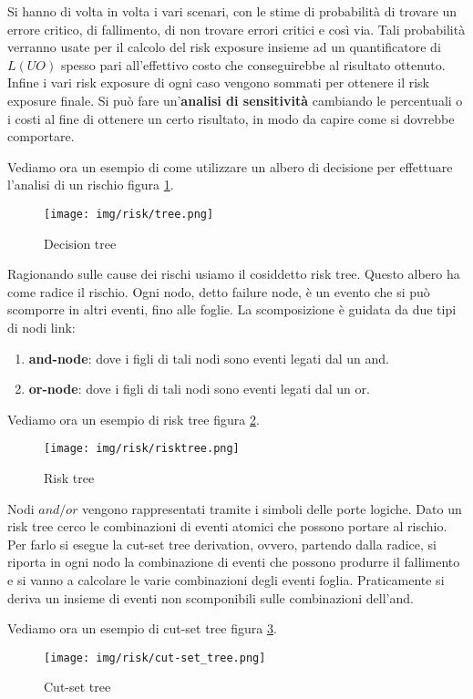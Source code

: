 Si hanno di volta in volta i vari scenari, con le stime di probabilità di trovare
un errore critico, di fallimento, di non trovare errori critici e così via. Tali
probabilità verranno usate per il calcolo del risk exposure insieme ad un
quantificatore di $L(UO)$ spesso pari all'effettivo costo che conseguirebbe al
risultato ottenuto. Infine i vari risk exposure di ogni caso vengono sommati per
ottenere il risk exposure finale. Si può fare un'\textbf{analisi di sensitività}
cambiando le percentuali o i costi al fine di ottenere un certo risultato, in
modo da capire come si dovrebbe comportare.
\begin{esempio}
    Vediamo ora un esempio di come utilizzare un albero di decisione per effettuare
    l'analisi di un rischio figura \ref{fig:tree}.
    \begin{figure}[!ht]
        \centering
        \texttt{[image: img/risk/tree.png]}
        \caption{Decision tree}
        \label{fig:tree}
    \end{figure}
\end{esempio}
Ragionando sulle cause dei rischi usiamo il cosiddetto risk tree. Questo albero
ha come radice il rischio. Ogni nodo, detto failure node, è un evento che si può
scomporre in altri eventi, fino alle foglie. La scomposizione è guidata da due
tipi di nodi link:
\begin{enumerate}
    \item \textbf{and-node}: dove i figli di tali nodi sono eventi legati dal un and.
    \item \textbf{or-node}: dove i figli di tali nodi sono eventi legati dal un or.
\end{enumerate}
\begin{esempio}
    Vediamo ora un esempio di risk tree figura \ref{fig:risk-tree}.
    \begin{figure}[!ht]
        \centering
        \texttt{[image: img/risk/risktree.png]}
        \caption{Risk tree}
        \label{fig:risk-tree}
    \end{figure}
\end{esempio}
Nodi $and/or$ vengono rappresentati tramite i simboli delle porte logiche. Dato un
risk tree cerco le combinazioni di eventi atomici che possono portare al rischio.
Per farlo si esegue la cut-set tree derivation, ovvero, partendo dalla radice, si
riporta in ogni nodo la combinazione di eventi che possono produrre il fallimento
e si vanno a calcolare le varie combinazioni degli eventi foglia. Praticamente si
deriva un insieme di eventi non scomponibili sulle combinazioni dell'and.
\begin{esempio}
    Vediamo ora un esempio di cut-set tree figura \ref{fig:cut-set-tree}.
    \begin{figure}[!ht]
        \centering
        \texttt{[image: img/risk/cut-set\_tree.png]}
        \caption{Cut-set tree}
        \label{fig:cut-set-tree}
    \end{figure}
\end{esempio}

